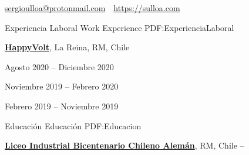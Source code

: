 \documentclass[letterpaper,yyyy,draft]{simpleresumecv}
\newcommand{\CVAuthor}{Sergio A. Ulloa B.}
\newcommand{\CVWebpage}{https://sulloa.com}
\begin{document}
\makeatletter
\let\@oddfoot\@empty{}
\let\@evenfoot\@empty{}
\makeatother

\Title{\CVAuthor}

{
    \begin{SubTitle}
    \href{mailto:sergioulloa@protonmail.com}{sergioulloa@protonmail.com}
    \,\SubBulletSymbol\,
    \href{\CVWebpage}{\url{\CVWebpage}}
    \end{SubTitle}
}

\begin{Body}


\Section
{Experiencia\newline
Laboral}
{Work Experience}
{PDF:ExperienciaLaboral}
{
    \Entry{}
    \href{https://happyvolt.com/}{\textbf{HappyVolt}},
    La Reina, RM, Chile

    \hfill
    Agosto 2020 -- Diciembre 2020

    \hfill
    Noviembre 2019 -- Febrero 2020

    \hfill
    Febrero 2019 -- Noviembre 2019

    \hfill
    \begin{Detail}


    \end{Detail}


    \begin{Detail}
    \end{Detail}
}


\Section
{Educación}
{Educación}
{PDF:Educacion}
{
    \Entry{}
    \href{https://www.lichan.cl/}{\textbf{Liceo Industrial Bicentenario Chileno Alemán}},
    RM, Chile
    \hfill
     -- 

}
\end{Body}
\end{document}
